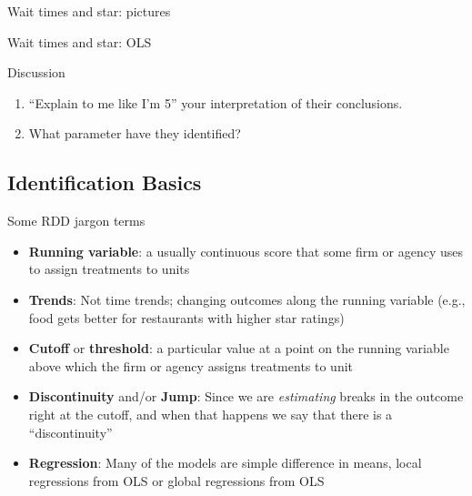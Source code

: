 \documentclass{beamer}
\begin{document}
\begin{frame}{Wait times and star: pictures}
	
	\begin{figure}
	\end{figure}

	
\end{frame}


\begin{frame}{Wait times and star: OLS}
	
	\begin{figure}
	\end{figure}
	
\end{frame}

\begin{frame}{Discussion}


\begin{enumerate}
\item  ``Explain to me like I'm 5'' your interpretation of their conclusions.
\item What parameter have they identified?
\end{enumerate}

\end{frame}







\subsection{Identification Basics}


\begin{frame}{Some RDD jargon terms}

\begin{itemize}
\item \textbf{Running variable}: a usually continuous score that some firm or agency uses to assign treatments to units
\item \textbf{Trends}: Not time trends; changing outcomes along the running variable (e.g., food gets better for restaurants with higher star ratings)
\item \textbf{Cutoff} or \textbf{threshold}: a particular value at a point on the running variable above which the firm or agency assigns treatments to unit
\item \textbf{Discontinuity} and/or \textbf{Jump}: Since we are \emph{estimating} breaks in the outcome right at the cutoff, and when that happens we say that there is a ``discontinuity''
\item \textbf{Regression}: Many of the models are simple difference in means, local regressions from OLS or global regressions from OLS
\end{itemize}

\end{frame}
\end{document}
